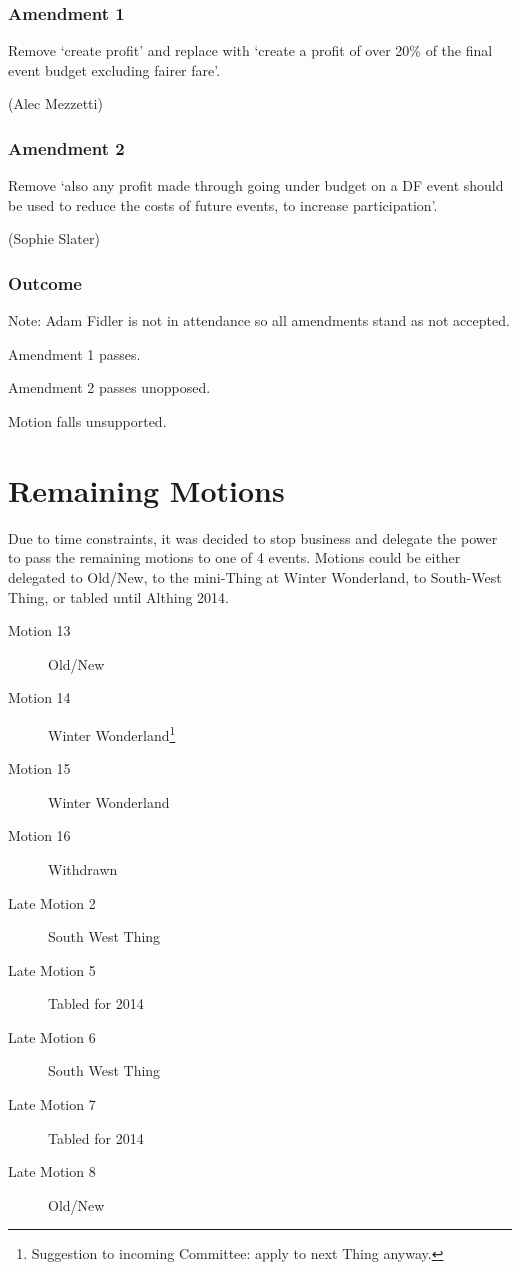 \documentclass[a4paper, 11pt]{article} %
\begin{document}
\subsubsection{Amendment 1}

Remove `create profit' and replace with `create a profit of over 20\% of the final event budget excluding fairer fare'.

(Alec Mezzetti)

\subsubsection{Amendment 2}

Remove `also any profit made through going under budget on a DF event should be used to reduce the costs of future events, to increase participation'.

(Sophie Slater)

\subsubsection{Outcome}

Note: Adam Fidler is not in attendance so all amendments stand as not accepted.

Amendment 1 passes.

Amendment 2 passes unopposed.

Motion falls unsupported.

\section{Remaining Motions}

Due to time constraints, it was decided to stop business and delegate the power to pass the remaining motions to one of 4 events.  Motions could be either delegated to Old/New, to the mini-Thing at Winter Wonderland, to South-West Thing, or tabled until Althing 2014.

\begin{description}
\item[Motion 13] Old/New
\item[Motion 14] Winter Wonderland\footnote{Suggestion to incoming Committee: apply to next Thing anyway.}
\item[Motion 15] Winter Wonderland
\item[Motion 16] Withdrawn
\item[Late Motion 2] South West Thing
\item[Late Motion 5] Tabled for 2014
\item[Late Motion 6] South West Thing
\item[Late Motion 7] Tabled for 2014
\item[Late Motion 8] Old/New
\end{description}
\end{document}
